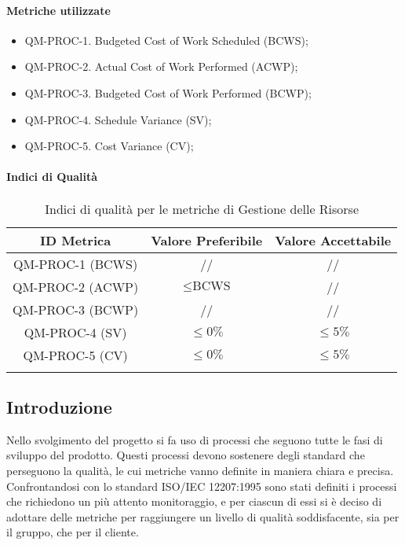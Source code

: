 		\paragraph{Metriche utilizzate}

			\begin{itemize}
				\item QM-PROC-1. Budgeted Cost of Work Scheduled (BCWS);
				\item QM-PROC-2. Actual Cost of Work Performed (ACWP);
				\item QM-PROC-3. Budgeted Cost of Work Performed (BCWP);
				\item QM-PROC-4. Schedule Variance (SV);
				\item QM-PROC-5. Cost Variance (CV);
			\end{itemize}

		\paragraph{Indici di Qualità}

			\begin{center}
				\begin{longtable}{|c|c|c|}
				\hline
				\rowcolor{lighter-grayer}
				\textbf{ID Metrica} & \textbf{Valore Preferibile} & \textbf{Valore Accettabile}\\
				\hline
				\endfirsthead
				\hline
				QM-PROC-1 (BCWS) & // & // \\
				\hline
				QM-PROC-2 (ACWP) & \( \le \text{BCWS}\) & // \\
				\hline
				QM-PROC-3 (BCWP) & // & // \\
				\hline
				QM-PROC-4 (SV) & \(\le 0\%\) & \(\le 5\%\) \\
				\hline
				QM-PROC-5 (CV) & \(\le 0\%\) & \(\le 5\%\) \\
				\hline
				\caption{Indici di qualità per le metriche di Gestione delle Risorse}
				\end{longtable}
			\end{center}




\subsection{Introduzione}

Nello svolgimento del progetto si fa uso di processi che seguono tutte le fasi di sviluppo del prodotto. Questi processi devono sostenere degli standard che perseguono la qualità, le cui metriche vanno definite in maniera chiara e precisa. Confrontandosi con lo standard ISO/IEC 12207:1995 sono stati definiti i processi che richiedono un più attento monitoraggio, e per ciascun di essi si è deciso di adottare delle metriche per raggiungere un livello di qualità soddisfacente, sia per il gruppo, che per il cliente.

